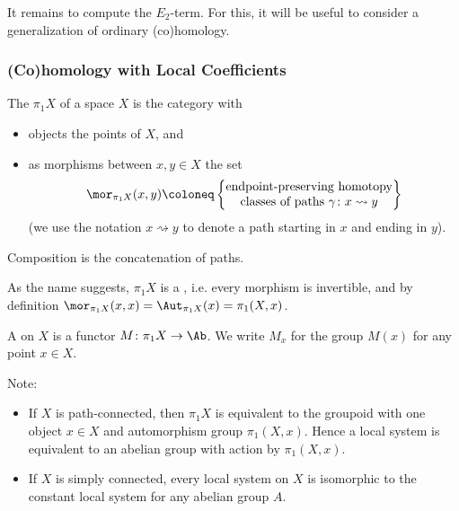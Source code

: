 It remains to compute the $E_2$-term.
For this, it will be useful to consider a generalization of ordinary (co)homology.

\subsubsection{(Co)homology with Local Coefficients}
\begin{definition}
	The  $\pi_1 X$ of a space $X$ is the category with
	\begin{itemize}
		\item objects the points of $X$, and
		\item as morphisms between $x, y \in X$ the set 
			\begin{equation*}
				\mor_{\pi_1 X}(x, y) \coloneq 
					\begin{Bmatrix}
						\text{endpoint-preserving homotopy} \\ 
						\text{classes of paths } \gamma\colon x \rightsquigarrow y
					\end{Bmatrix}
			\end{equation*}
			(we use the notation $x \rightsquigarrow y$ to denote a path starting in $x$ and ending in $y$).
	\end{itemize}
	Composition is the concatenation of paths.
\end{definition}
As the name suggests, $\pi_1 X$ is a , i.e. every morphism is invertible, and by definition $\mor_{\pi_1 X}(x, x) = \Aut_{\pi_1 X}(x) = \pi_1(X, x)$.
\begin{definition}
	A  on $X$ is a functor $M\colon \pi_1 X \to \Ab$.
	We write $M_x$ for the group $M(x)$ for any point $x \in X$.
\end{definition}
Note:
\begin{itemize}
	\item If $X$ is path-connected, then $\pi_1 X$ is equivalent to the groupoid with one object $x \in X$ and automorphism group $\pi_1(X, x)$.
		Hence a local system is equivalent to an abelian group with action by $\pi_1(X, x)$.
	\item If $X$ is simply connected, every local system on $X$ is isomorphic to the constant local system for any abelian group $A$.
\end{itemize}
